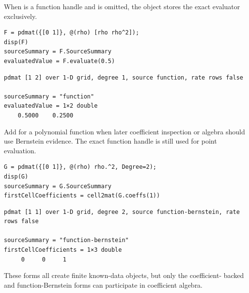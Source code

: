 When  is a function handle and  is omitted, the object stores the exact evaluator exclusively.

\begin{lstlisting}[style=dpmatlab]
F = pdmat({[0 1]}, @(rho) [rho rho^2]);
disp(F)
sourceSummary = F.SourceSummary
evaluatedValue = F.evaluate(0.5)
\end{lstlisting}

\begin{lstlisting}[style=dpoutput]
pdmat [1 2] over 1-D grid, degree 1, source function, rate rows false

sourceSummary = "function"
evaluatedValue = 1×2 double
    0.5000    0.2500
\end{lstlisting}

Add  for a polynomial function when later coefficient inspection or algebra should use Bernstein evidence.  The exact function handle is still used for point evaluation.

\begin{lstlisting}[style=dpmatlab]
G = pdmat({[0 1]}, @(rho) rho.^2, Degree=2);
disp(G)
sourceSummary = G.SourceSummary
firstCellCoefficients = cell2mat(G.coeffs(1))
\end{lstlisting}

\begin{lstlisting}[style=dpoutput]
pdmat [1 1] over 1-D grid, degree 2, source function-bernstein, rate rows false

sourceSummary = "function-bernstein"
firstCellCoefficients = 1×3 double
     0     0     1
\end{lstlisting}

These forms all create finite known-data objects, but only the coefficient- backed and function-Bernstein forms can participate in coefficient algebra.

